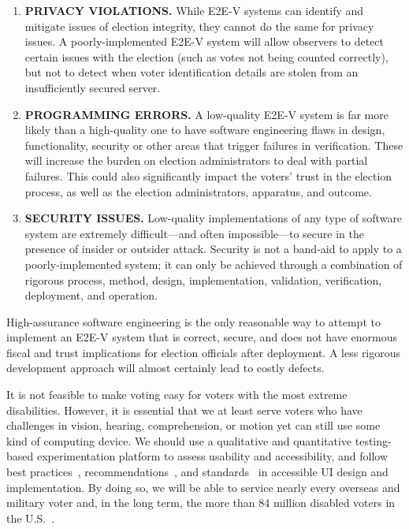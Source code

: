 \begin{enumerate}
\item \textbf{PRIVACY VIOLATIONS.} While E2E-V systems can identify
  and mitigate issues of election integrity, they cannot do the same
  for privacy issues. A poorly-implemented E2E-V system will allow
  observers to detect certain issues with the election (such as votes
  not being counted correctly), but not to detect when voter
  identification details are stolen from an insufficiently secured
  server.
\item \textbf{PROGRAMMING ERRORS.} A low-quality E2E-V system is far
  more likely than a high-quality one to have software engineering
  flaws in design, functionality, security or other areas that trigger
  failures in verification. These will increase the burden on election
  administrators to deal with partial failures. This could also
  significantly impact the voters' trust in the election process, as
  well as the election administrators, apparatus, and outcome.
\item \textbf{SECURITY ISSUES.} Low-quality implementations of any
  type of software system are extremely difficult---and often
  impossible---to secure in the presence of insider or outsider
  attack. Security is not a band-aid to apply to a poorly-implemented
  system; it can only be achieved through a combination of rigorous
  process, method, design, implementation, validation, verification,
  deployment, and operation.
\end{enumerate}

High-assurance software engineering is the only reasonable way to
attempt to implement an E2E-V system that is correct, secure, and does
not have enormous fiscal and trust implications for election officials
after deployment. A less rigorous development approach will almost
certainly lead to costly defects.


It is not feasible to make voting easy for voters with the most
extreme disabilities. However, it is essential that we at least serve
voters who have challenges in vision, hearing, comprehension, or
motion yet can still use some kind of computing device. We should use
a qualitative and quantitative testing-based experimentation platform
to assess usability and accessibility, and follow best
practices~\cite{materials-at-elections.itif.org},
recommendations~\cite{WAI,Section508,WAVE}, and
standards~\cite{ADAStandards} in accessible UI design and
implementation. By doing so, we will be able to service nearly every
overseas and military voter and, in the long term, the more than 84
million disabled voters in the U.S.~\cite{CensusData}.

